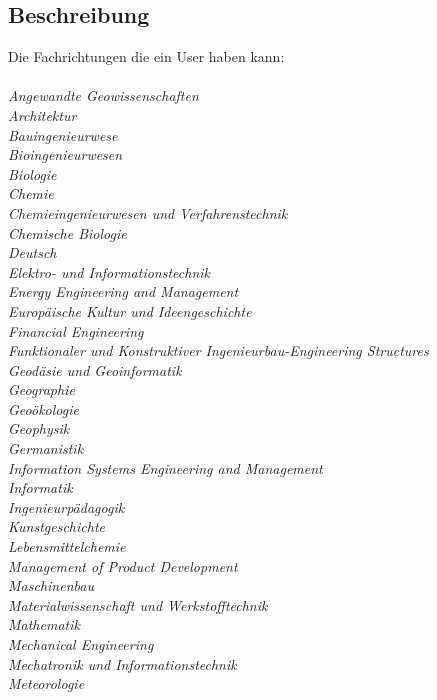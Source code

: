 \documentclass[a4paper]{scrreprt}
\begin{document}
\subsection*{Beschreibung}
Die Fachrichtungen die ein User haben kann: \\ \\
\textit{Angewandte Geowissenschaften}\\
\textit{Architektur}\\
\textit{Bauingenieurwese}\\
\textit{Bioingenieurwesen}\\
\textit{Biologie}\\
\textit{Chemie}\\
\textit{Chemieingenieurwesen und Verfahrenstechnik}\\
\textit{Chemische Biologie}\\
\textit{Deutsch}\\
\textit{Elektro- und Informationstechnik}\\
\textit{Energy Engineering and Management}\\
\textit{Europäische Kultur und Ideengeschichte}\\
\textit{Financial Engineering}\\
\textit{Funktionaler und Konstruktiver Ingenieurbau-Engineering Structures}\\
\textit{Geodäsie und Geoinformatik}\\
\textit{Geographie}\\
\textit{Geoökologie}\\
\textit{Geophysik}\\
\textit{Germanistik}\\
\textit{Information Systems Engineering and Management} \\
\textit{Informatik}\\
\textit{Ingenieurpädagogik}\\
\textit{Kunstgeschichte}\\
\textit{Lebensmittelchemie}\\
\textit{Management of Product Development} \\
\textit{Maschinenbau}\\
\textit{Materialwissenschaft und Werkstofftechnik}\\
\textit{Mathematik}\\
\textit{Mechanical Engineering} \\
\textit{Mechatronik und Informationstechnik} \\
\textit{Meteorologie}\\
\end{document}
